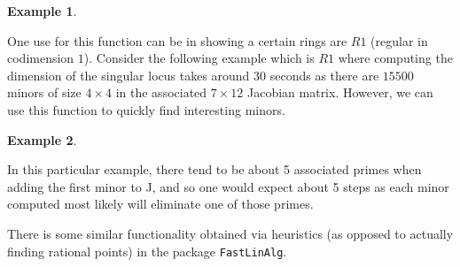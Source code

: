 \documentclass[11pt]{amsart}
\theoremstyle{definition}
\newtheorem{example}{Example}[section]
\begin{document}
\begin{example}
	
\end{example}

One use for this function can be in showing a certain rings are $R1$ (regular in codimension $1$).
Consider the following example which is $R1$ where computing the dimension of the singular locus takes around $30$ seconds as there are $15500$ minors of size $4 \times 4$ in the associated $7 \times 12$ Jacobian matrix.  However, we can use this function to quickly find interesting minors.
\begin{example}
	
	\end{example} 

In this particular example, there tend to be about 5 associated primes when adding the first minor to J, and so one would expect about 5 steps as each minor computed most likely will eliminate one of those primes.

There is some similar functionality obtained via heuristics (as opposed to actually finding rational points) in the package {\tt FastLinAlg}.


\vspace{2em}
\end{document}

